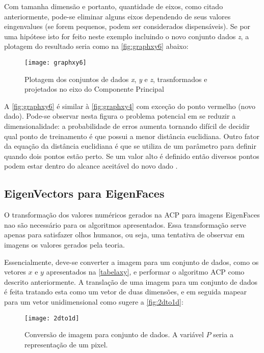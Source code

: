 Com tamanha dimensão e portanto, quantidade de eixos, como citado anteriormente, pode-se eliminar alguns eixos dependendo de seus valores eingenvalues (se forem pequenos, podem ser considerados dispensáveis). Se por uma hipótese isto for feito neste exemplo incluindo o novo conjunto dados \textit{z}, a plotagem do resultado seria como na \autoref{fig:graphxy6} abaixo:

\begin{figure}[h]
	\centering
	\texttt{[image: graphxy6]}
	\caption{Plotagem dos conjuntos de dados \textit{x}, \textit{y} e \textit{z}, trasnformados e projetados no eixo do Componente Principal}
	\label{fig:graphxy6}
\end{figure}

A \autoref{fig:graphxy6} é similar à \autoref{fig:graphxy4} com exceção do ponto vermelho (novo dado). Pode-se observar nesta figura o problema potencial em se reduzir a dimensionalidade: a probabilidade de erros aumenta tornando difícil de decidir qual ponto de treinamento é que possui a menor distância euclidiana. Outro fator da equação da distância euclidiana é que se utiliza de um parâmetro para definir quando dois pontos estão perto. Se um valor alto é definido então diversos pontos podem estar dentro do alcance aceitável do novo dado \cite{drmathew_java_programming}.


\subsection{EigenVectors para EigenFaces}\label{subsec:vectoface}

O transformação dos valores numéricos gerados na ACP para imagens EigenFaces nao são necessário para os algoritmos apresentados. Essa transformação serve apenas para satisfazer olhos humanos, ou seja, uma tentativa de observar em imagens os valores gerados pela teoria.


Essencialmente, deve-se converter a imagem para um conjunto de dados, como os vetores $ x $ e $ y $ apresentados na \autoref{tabelaxy}, e performar o algoritmo ACP como descrito anteriormente. A translação de uma imagem para um conjunto de dados é feita tratando esta como um vetor de duas dimensões, e em seguida mapear para um vetor unidimensional como sugere a \autoref{fig:2dto1d}:

\begin{figure}[h]
	\centering
	\texttt{[image: 2dto1d]}
	\caption{Conversão de imagem para conjunto de dados. A variável $P$ seria a representação de um pixel.}
	\label{fig:2dto1d}
\end{figure}

